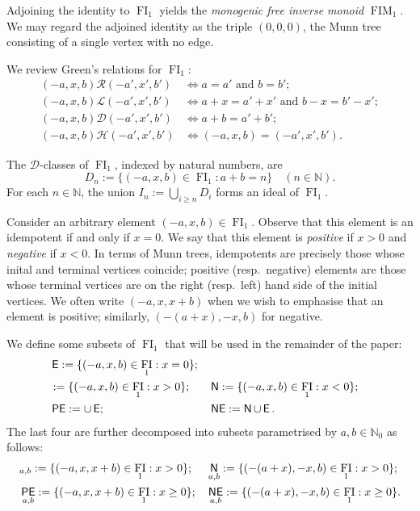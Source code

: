 \documentclass[reqno]{amsart}
\theoremstyle{plain}
\theoremstyle{definition}
\DeclareMathOperator{\FI}{FI}
\DeclareMathOperator{\FIM}{FIM}
\let\P\relax
\DeclareMathOperator{\P}{\textup{\textsf{P}}}
\DeclareMathOperator{\N}{\textup{\textsf{N}}}
\DeclareMathOperator{\E}{\textup{\textsf{E}}}
\DeclareMathOperator{\PE}{\textup{\textsf{PE}}}
\DeclareMathOperator{\NE}{\textup{\textsf{NE}}}
\numberwithin{equation}{section}
\begin{document}
Adjoining the identity to $\FI_1$ yields the \emph{monogenic free inverse monoid} $\FIM_1$. We may regard the adjoined identity as the triple $(0, 0, 0)$, the Munn tree consisting of a single vertex with no edge.

We review Green's relations for $\FI_1$: 
\begin{align*}
    (-a, x, b) \mathscr{R} (-a', x', b') &\Leftrightarrow a = a' \text{ and } b = b';\\
    (-a, x, b) \mathscr{L} (-a', x', b') &\Leftrightarrow a + x = a' + x' \text{ and } b - x = b' - x';\\
    (-a, x, b) \mathscr{D} (-a', x', b') &\Leftrightarrow a+b = a'+b';\\
    (-a, x, b) \mathscr{H} (-a', x', b') &\Leftrightarrow (-a, x, b) = (-a', x', b').
\end{align*}



The $\mathscr{D}$-classes of $\FI_1$, indexed by natural numbers, are
\[
D_n := \{(-a, x, b)\in\FI_1 : a+b=n\} \quad (n\in\mathbb{N}).
\]
For each $n\in\mathbb{N}$, the union $I_n := \bigcup_{i\geq n}D_i$ forms an ideal of $\FI_1$.

Consider an arbitrary element $(-a, x, b)\in \FI_1$. Observe that this element is an idempotent if and only if $x=0$. We say that this element is \emph{positive} if $x>0$ and \emph{negative} if $x<0$. In terms of Munn trees, idempotents are precisely those whose inital and terminal vertices coincide; positive (resp.\ negative) elements are those whose terminal vertices are on the right (resp.\ left) hand side of the initial vertices. We often write $(-a, x, x+b)$ when we wish to emphasise that an element is positive; similarly, $(-(a+x), -x, b)$ for negative.

We define some subsets of $\FI_1$ that will be used in the remainder of the paper: 
\begin{align*}
    &\E := \{(-a, x, b)\in\FI_1: x=0\};\\
    &\P := \{(-a, x, b)\in\FI_1: x>0\}; &&\N := \{(-a, x, b)\in\FI_1: x<0\};\\
    &\PE := \P\cup \E; &&\NE := \N\cup\E.
\end{align*}
The last four
are further decomposed into subsets 
parametrised by $a,b\in\mathbb{N}_0$ as follows:
\begin{align*}
    &\P_{a,b} := \{(-a, x, x+b) \in \FI_1 : x>0\};&&\N_{a,b} := \{(-(a+x), -x, b) \in\FI_1 : x>0\};\\
    &\PE_{a,b} := \{(-a, x, x+b)\in \FI_1 : x\geq 0\};&
    &\NE_{a,b} := \{(-(a+x), -x, b)\in\FI_1: x\geq 0\}.
\end{align*}
\end{document}
